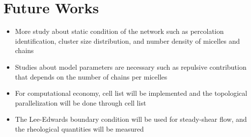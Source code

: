 \documentclass[10pt, a4paper]{article}
\begin{document}
\section{Future Works}
\begin{itemize}
\item More study about static condition of the network such as percolation identification, cluster size distribution, and number density of micelles and chains
\item Studies about model parameters are necessary such as repulsive contribution that depends on the number of chains per micelles
\item For computational economy, cell list will be implemented and the topological parallelization will be done through cell list
\item The Lee-Edwards boundary condition will be used for steady-shear flow, and the rheological quantities will be measured
\end{itemize}

  
\end{document}
